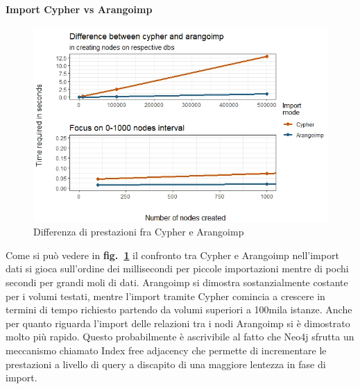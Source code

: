 \documentclass[fleqn,10pt]{SelfArx} %
\begin{document}
{{\paragraph{Import Cypher vs Arangoimp}
\begin{figure}
\centering
\includegraphics[scale=0.54]{viz_benchmark_cypher_arangoimp.jpeg}
\caption{\label{plot_cypher_arangoimp} Differenza di prestazioni fra Cypher e Arangoimp}
\end{figure}
Come si può vedere in \textbf{fig.~\ref{plot_cypher_arangoimp}} il confronto tra Cypher e Arangoimp nell'import dati si gioca sull'ordine dei millisecondi per piccole importazioni mentre di pochi secondi per grandi moli di dati. 
Arangoimp si dimostra sostanzialmente costante per i volumi testati, mentre l'import tramite Cypher comincia a crescere in termini di tempo richiesto partendo da volumi superiori a 100mila istanze. 
Anche per quanto riguarda l'import delle relazioni tra i nodi Arangoimp si è dimostrato molto più rapido. 
Questo probabilmente è ascrivibile al fatto che Neo4j sfrutta un meccanismo chiamato Index free adjacency che permette di incrementare le prestazioni a livello di query a discapito di una maggiore lentezza in fase di import. 
}}
\end{document}

